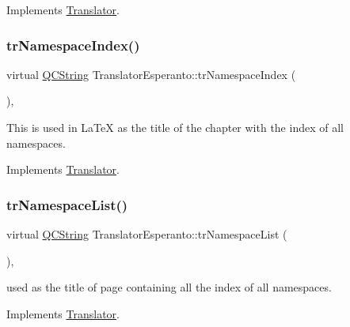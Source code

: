 Implements \mbox{\hyperlink{class_translator}{Translator}}.

\mbox{\label{class_translator_esperanto_aaf3b6083774b083405a1c7fdc17a6f0a}} 
\subsubsection{\texorpdfstring{trNamespaceIndex()}{trNamespaceIndex()}}
{\footnotesize\ttfamily virtual \mbox{\hyperlink{class_q_c_string}{Q\+C\+String}} Translator\+Esperanto\+::tr\+Namespace\+Index (\begin{DoxyParamCaption}{ }\end{DoxyParamCaption})\hspace{0.3cm}{\ttfamily [inline]}, {\ttfamily [virtual]}}

This is used in La\+TeX as the title of the chapter with the index of all namespaces. 

Implements \mbox{\hyperlink{class_translator}{Translator}}.

\mbox{\label{class_translator_esperanto_a6e05e1ffb5ad5550994b79f4195acdda}} 
\subsubsection{\texorpdfstring{trNamespaceList()}{trNamespaceList()}}
{\footnotesize\ttfamily virtual \mbox{\hyperlink{class_q_c_string}{Q\+C\+String}} Translator\+Esperanto\+::tr\+Namespace\+List (\begin{DoxyParamCaption}{ }\end{DoxyParamCaption})\hspace{0.3cm}{\ttfamily [inline]}, {\ttfamily [virtual]}}

used as the title of page containing all the index of all namespaces. 

Implements \mbox{\hyperlink{class_translator}{Translator}}.

\mbox{\label{class_translator_esperanto_adfdc62a7a70ff8aec5ca8b3e51a025cd}} 
